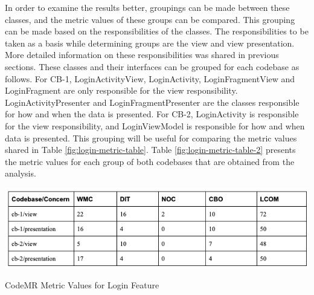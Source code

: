 In order to examine the results better, groupings can be made between these classes, and the metric values of these groups can be compared. This grouping can be made based on the responsibilities of the classes. The responsibilities to be taken as a basis while determining groups are the view and view presentation. More detailed information on these responsibilities was shared in previous sections. These classes and their interfaces can be grouped for each codebase as follows. For CB-1, LoginActivityView, LoginActivity, LoginFragmentView and LoginFragment are only responsible for the view responsibility.  LoginActivityPresenter and LoginFragmentPresenter are the classes responsible for how and when the data is presented. For CB-2, LoginActivity is responsible for the view responsibility, and LoginViewModel is responsible for how and when data is presented. This grouping will be useful for comparing the metric values shared in Table \ref{fig:login-metric-table}. Table \ref{fig:login-metric-table-2} presents the metric values for each group of both codebases that are obtained from the analysis.

\begin{table}[htb]
    \centering
    \includegraphics[scale=0.5]{figures/login-metric-table-2.png}
    \caption{CodeMR Metric Values for Login Feature}
    \label{fig:login-metric-table-2}
\end{table}

